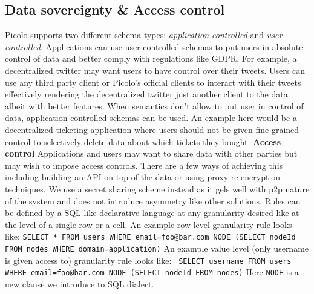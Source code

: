 \subsection{Data sovereignty \& Access control} \label{sec:access_control}
Picolo supports two different schema types: \textit{application controlled} and \textit{user controlled}. Applications can use user controlled schemas to put users in absolute control of data and better comply with regulations like GDPR. For example, a decentralized twitter may  want users to have control over their tweets. Users can use any third party client or Picolo's official clients to interact with their tweets effectively rendering the decentralized twitter just another client to the data albeit with better features. \newline\newline
When semantics don't allow to put user in control of data, application controlled schemas can be used. An example here would be a decentralized ticketing application where users should not be given fine grained control to selectively delete data about which tickets they bought.
\newline\newline
\textbf{Access control} 
Applications and users may want to share data with other parties but may wish to impose access controls. There are a few ways of achieving this including building an API on top of the data or using proxy re-encryption techniques. We use a secret sharing scheme instead as it gels well with p2p nature of the system and does not introduce asymmetry like other solutions. Rules can be defined by a SQL like declarative language at any granularity desired like at the level of a single row or a cell. An example row level granularity rule looks like:\newline \newline
\texttt{SELECT  * \newline FROM users \newline WHERE email=foo@bar.com \newline NODE (SELECT nodeId FROM nodes WHERE domain=application)} \newline \newline
An example value level (only username is given access to) granularity rule looks like:\newline \newline
\texttt{ SELECT username \newline FROM users \newline WHERE email=foo@bar.com \newline NODE (SELECT nodeId FROM nodes)}\newline\newline
Here \texttt{NODE} is a new clause we introduce to SQL dialect.